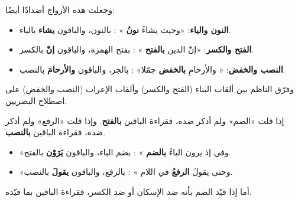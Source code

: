 \maana وجعلت هذه الأزواج أضدادًا أيضًا:
\begin{itemize}
\item \textbf{النون والياء}: «وحيث يشاءُ \textbf{نونُ} » \ila{} \IbnKathir:   بالنون، والباقون \textbf{يشاء} بالياء.
\item \textbf{الفتح والكسر}: «إنّ الدين \textbf{بالفتح} » \ila{} \Kisai:   بفتح الهمزة، والباقون \textbf{إنّ} بالكسر.
\item \textbf{النصب والخفض}: «\Hamza{} والأرحامِ \textbf{بالخفض} جمّلا» \ila{} \Hamza:   بالجر، والباقون \textbf{والأرحامَ} بالنصب.
\end{itemize}
وفرّق الناظم بين ألقاب البناء (الفتح والكسر) وألقاب الإعراب (النصب والخفض) على اصطلاح البصريين.

\maana إذا قلت «الضم» ولم أذكر ضده، فقراءة الباقين \textbf{بالفتح}. وإذا قلت «الرفع» ولم أذكر ضده، فقراءة الباقين \textbf{بالنصب}.
\begin{amthila}
\begin{itemize}
\item «وفي إذ يرون الياءُ \textbf{بالضم} » \ila{} \IbnAmir:   بضم الياء، والباقون \textbf{يَرَوْن} بالفتح.
\item «وحتى يقولَ \textbf{الرفعُ} في اللام » \ila{} \Nafi:   بالرفع، والباقون \textbf{يقولَ} بالنصب.
\end{itemize}
أما إذا قيّد الضم بأنه ضد الإسكان أو ضد الكسر، فقراءة الباقين بما قيّده.
\end{amthila}

